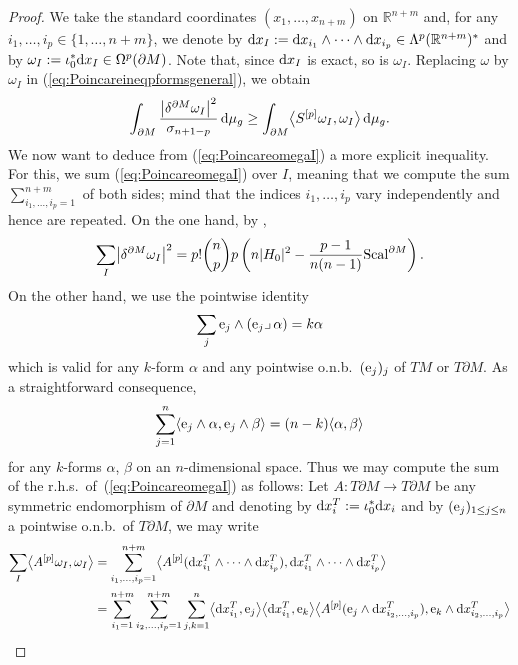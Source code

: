 \documentclass[pdftex]{sigma}
\numberwithin{equation}{section}
\begin{document}
\begin{proof}
We take the standard coordinates $(x_1,\dots,x_{n+m})$ on $\mathbb{R}^{n+m}$ and, for any $i_1,\dots,i_p\in\{1,\dots,n+m\}$, we denote by ${\rm d}x_I:={\rm d}x_{i_1}\wedge\dots\wedge {\rm d}x_{i_p}\in\Lambda^p(\mathbb{R}^{n+m})^*$ and by $\omega_I:=\iota_0^* {\rm d}x_I\in\Omega^p(\partial M)$. Note that, since ${\rm d}x_I$ is exact, so is $\omega_I$.
Replacing $\omega$ by $\omega_I$ in (\ref{eq:Poincareineqpformsgeneral}), we obtain
\begin{equation}\label{eq:PoincareomegaI}
\int_{\partial M}\frac{\bigl|\delta^{\partial M}\omega_I\bigr|^2}{\sigma_{n+1-p}}\,{\rm d}\mu_g\geq\int_{\partial M}\bigl\langle S^{[p]}\omega_I,\omega_I\bigr\rangle\,{\rm d}\mu_g.
\end{equation}
We now want to deduce from (\ref{eq:PoincareomegaI}) a more explicit i\-ne\-qua\-li\-ty. For this, we sum (\ref{eq:PoincareomegaI}) over $I$, meaning that we compute the sum $\sum_{i_1,\dots,i_p=1}^{n+m}$ of both sides; mind that the indices $i_1,\dots,i_p$ vary independently and hence are repeated. On the one hand, by \cite[Lemma 2.2]{Savo05},
\begin{equation}\label{eq:sumdeltaomegaI2}
\sum_I\bigl|\delta^{\partial M}\omega_I\bigr|^2=p!\binom{n}{p}p\left(n|H_0|^2-\frac{p-1}{n(n-1)}{\rm Scal}^{\partial M}\right).
\end{equation}
On the other hand, we use the pointwise identity
\[\sum_{j}{\rm e}_j\wedge({\rm e}_j\lrcorner\,\alpha)=k\alpha\]
which is valid for any $k$-form $\alpha$ and any pointwise o.n.b.\ $({\rm e}_j)_j$ of $TM$ or $T\partial M$.
As a straightforward consequence,
\begin{equation*}
\sum_{j=1}^n\langle {\rm e}_j\wedge\alpha,{\rm e}_j\wedge\beta\rangle=(n-k)\langle\alpha,\beta\rangle
\end{equation*}
for any $k$-forms $\alpha$, $\beta$ on an $n$-dimensional space. Thus we may compute the sum of the r.h.s.\ of~(\ref{eq:PoincareomegaI}) as follows:  Let $A\colon T\partial M\to T\partial M$ be any symmetric endomorphism of $\partial M$  and denoting by ${\rm d}x_i^T:=\iota_0^*{\rm d}x_i$ and by $({\rm e}_j)_{1\leq j\leq n}$ a pointwise o.n.b.\ of $T\partial M$, we may write
\begin{align}
\sum_I\bigl\langle A^{[p]}\omega_I,\omega_I\bigr\rangle&= \sum_{i_1,\dots,i_p=1}^{n+m}\bigl\langle A^{[p]}({\rm d}x_{i_1}^T\wedge\dots\wedge {\rm d}x_{i_p}^T),{\rm d}x_{i_1}^T\wedge\dots\wedge {\rm d}x_{i_p}^T\bigr\rangle\nonumber\\
&= \sum_{i_1=1}^{n+m}\sum_{i_2,\dots,i_p=1}^{n+m}\sum_{j,k=1}^n\bigl\langle {\rm d}x_{i_1}^T,{\rm e}_j\bigr\rangle\bigl\langle {\rm d}x_{i_1}^T,{\rm e}_k\bigr\rangle\bigl\langle A^{[p]}({\rm e}_j\wedge {\rm d}x_{i_2,\dots,i_p}^T),{\rm e}_k\wedge {\rm d}x_{i_2,\dots,i_p}^T\bigr\rangle\nonumber\\

\end{align}
\end{proof}
\end{document}
